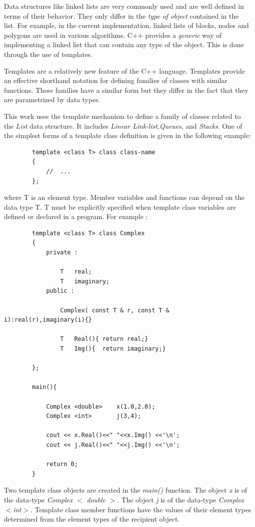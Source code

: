 	Data structures like linked lists are very commonly used and are well 
	defined in terms of their behavior. They only differ in the {\em type of 
	object} contained in the list. For example, in the current
	implementation, linked lists of blocks, nodes and polygons are used in 
	various algorithms. C++ provides a {\em generic} way of implementing a
	linked list that can contain any type of the object. This is done through
	the use of templates.

	Templates are a relatively new feature of the C++ language. Templates
	provide an effective shorthand notation for defining families of classes
	with similar functions. These families have a similar form but they differ
	in the fact that they are parametrized by data types.

	This work uses the template mechanism to define a family of classes related
	to the {\em List} data structure. It includes {\em Linear Link-list,Queues,}
	and {\em Stacks}. One of the simplest forms of a template class definition
	is given in the following example:%
		\begin{verbatim}
		template <class T> class class-name
		{
			//	...
		};
		\end{verbatim}
		where T is an element type. Member variables and functions can depend
		on the data type T. T must be explicitly specified when template class
		variables are defined or declared in a program. For example :
		\begin{verbatim}
		template <class T> class Complex
		{
			private :

				T	real;
				T	imaginary;
			public :
				
				Complex( const T & r, const T & i):real(r),imaginary(i){}

				T	Real(){ return real;}
				T 	Img(){	return imaginary;}

		};

		main(){

			Complex <double>	x(1.0,2.0);
			Complex	<int>		j(3,4);

			cout << x.Real()<<" "<<x.Img() <<'\n';
			cout << j.Real()<<" "<<j.Img() <<'\n';

			return 0;
		}
		\end{verbatim}

		Two template class objects are created in the {\em main()} function.
		The object {\em x} is of the data-type {\em Complex $<$ double
		$>$}.
		The object {\em j} is of the data-type {\em Complex$<$int$>$}.
		Template class member functions have the values of their element types
		determined from the element types of the recipient object.

